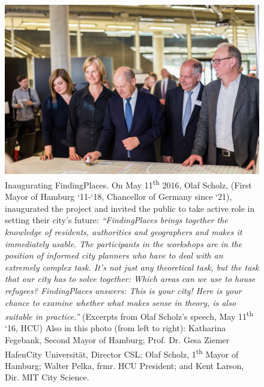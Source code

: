 {{        \begin{figure}[!htb]
            \begin{center}
                \includegraphics[width=1\textwidth]{chapters/consensus/findingplaces/figures/fp6.jpg}
            \end{center}
            \caption{
                Inaugurating FindingPlaces. On May 11\textsuperscript{th} 2016, Olaf Scholz, (First Mayor of Hamburg `11-`18, Chancellor of Germany since `21), inaugurated the project and invited the public to take active role in setting their city's future: \textit{``FindingPlaces brings together the knowledge of residents, authorities and geographers and makes it immediately usable. The participants in the workshops are in the position of informed city planners who have to deal with an extremely complex task. It's not just any theoretical task, but the task that our city has to solve together: Which areas can we use to house refugees? FindingPlaces answers: This is your city! Here is your chance to examine whether what makes sense in theory, is also suitable in practice.''} (Excerpts from Olaf Scholz's speech, May 11\textsuperscript{th} `16, HCU) Also in this photo (from left to right): Katharina Fegebank, Second Mayor of Hamburg; Prof. Dr. Gesa Ziemer HafenCity Universität, Director CSL; Olaf Scholz, 1\textsuperscript{th} Mayor of Hamburg; Walter Pelka, frmr. HCU President; and Kent Larson, Dir. MIT City Science.
            }
            \label{fig:fp_olaf_scholz}
        \end{figure}


}}
